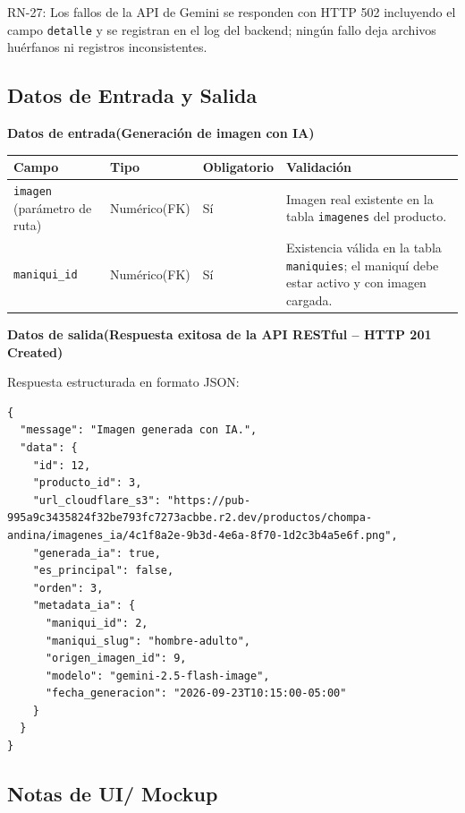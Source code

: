 \documentclass[12pt,a4paper]{article}
\begin{document}
RN-27: Los fallos de la API de Gemini se responden con HTTP 502 incluyendo el campo \texttt{detalle} y se registran en el log del backend; ningún fallo deja archivos huérfanos ni registros inconsistentes.

\subsection*{Datos de Entrada y Salida}

\textbf{Datos de entrada(Generación de imagen con IA)}

\begin{center}
\small
\begin{tabularx}{\textwidth}{p{3.2cm} p{2.8cm} p{1.8cm} L}
\toprule
\textbf{Campo} & \textbf{Tipo} & \textbf{Obligatorio} & \textbf{Validación} \\
\midrule
\texttt{imagen} (parámetro de ruta) & Numérico(FK) & Sí & Imagen real existente en la tabla \texttt{imagenes} del producto. \\
\texttt{maniqui\_id} & Numérico(FK) & Sí & Existencia válida en la tabla \texttt{maniquies}; el maniquí debe estar activo y con imagen cargada. \\
\bottomrule
\end{tabularx}
\end{center}

\textbf{Datos de salida(Respuesta exitosa de la API RESTful -- HTTP 201 Created)}

Respuesta estructurada en formato JSON:

\begin{lstlisting}
{
  "message": "Imagen generada con IA.",
  "data": {
    "id": 12,
    "producto_id": 3,
    "url_cloudflare_s3": "https://pub-995a9c3435824f32be793fc7273acbbe.r2.dev/productos/chompa-andina/imagenes_ia/4c1f8a2e-9b3d-4e6a-8f70-1d2c3b4a5e6f.png",
    "generada_ia": true,
    "es_principal": false,
    "orden": 3,
    "metadata_ia": {
      "maniqui_id": 2,
      "maniqui_slug": "hombre-adulto",
      "origen_imagen_id": 9,
      "modelo": "gemini-2.5-flash-image",
      "fecha_generacion": "2026-09-23T10:15:00-05:00"
    }
  }
}
\end{lstlisting}

\subsection*{Notas de UI/ Mockup}
\end{document}
